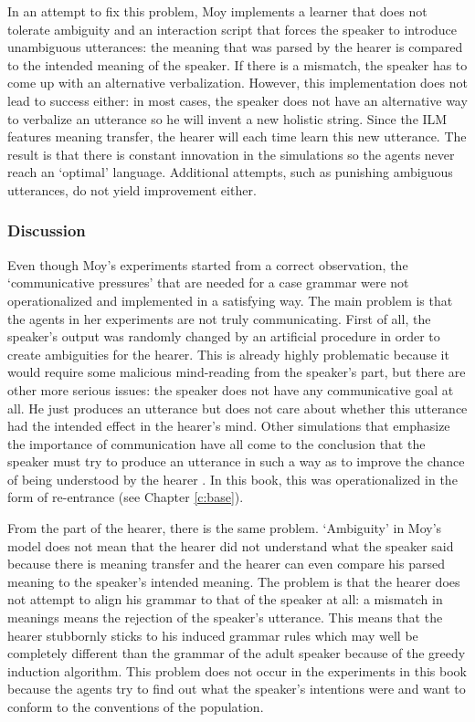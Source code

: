 In an attempt to fix this problem, Moy implements a learner that does not tolerate ambiguity and an interaction script that forces the speaker to introduce unambiguous utterances: the meaning that was parsed by the hearer is compared to the intended meaning of the speaker. If there is a mismatch, the speaker has to come up with an alternative verbalization. However, this implementation does not lead to success either: in most cases, the speaker does not have an alternative way to verbalize an utterance so he will invent a new holistic string. Since the ILM features meaning transfer, the hearer will each time learn this new utterance. The result is that there is constant innovation in the simulations so the agents never reach an `optimal' language. Additional attempts, such as punishing ambiguous utterances, do not yield improvement either.


\subsubsection{Discussion}
Even though Moy's experiments started from a correct observation, the `communicative pressures' that are needed for a case grammar were not operationalized and implemented in a satisfying way. The main problem is that the agents in her experiments are not truly communicating. First of all, the speaker's output was randomly changed by an artificial procedure in order to create ambiguities for the hearer. This is already highly problematic because it would require some malicious mind-reading from the speaker's part, but there are other more serious issues: the speaker does not have any communicative goal at all. He just produces an utterance but does not care about whether this utterance had the intended effect in the hearer's mind. Other simulations that emphasize the importance of communication have all come to the conclusion that the speaker must try to produce an utterance in such a way as to improve the chance of being understood by the hearer \citep{smith03intelligent, steels03language}. In this book, this was operationalized in the form of re-entrance (see Chapter \ref{c:base}).

From the part of the hearer, there is the same problem. `Ambiguity' in Moy's model does not mean that the hearer did not understand what the speaker said because there is meaning transfer and the hearer can even compare his parsed meaning to the speaker's intended meaning. The problem is that the hearer does not attempt to align his grammar to that of the speaker at all: a mismatch in meanings means the rejection of the speaker's utterance. This means that the hearer stubbornly sticks to his induced grammar rules which may well be completely different than the grammar of the adult speaker because of the greedy induction algorithm. This problem does not occur in the experiments in this book because the agents try to find out what the speaker's intentions were and want to conform to the conventions of the population.

